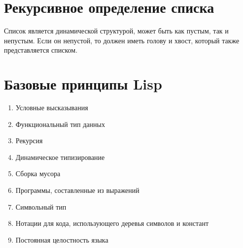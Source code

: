 \documentclass[a4paper,12pt]{article}
\begin{document}
	\section*{Рекурсивное определение списка}
	
	Список является динамической структурой, может быть как пустым, так и непустым. Если он непустой, то должен иметь голову и хвост, который также представляется списком.
	
	\section*{Базовые принципы Lisp}
	
	\begin{enumerate}
		\item Условные высказывания
		\item Функциональный тип данных
		\item Рекурсия
		\item Динамическое типизирование
		\item Сборка мусора
		\item Программы, составленные из выражений
		\item Символьный тип
		\item Нотации для кода, использующего деревья символов и констант
		\item Постоянная целостность языка
	\end{enumerate}
	
	
\end{document}

